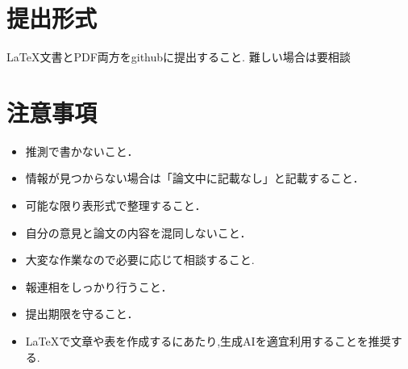 \documentclass[a4j, twocolumn]{jsarticle}  %
\begin{document}
\section{提出形式}

LaTeX文書とPDF両方をgithubに提出すること.
難しい場合は要相談

\section{注意事項}

\begin{itemize}
    \item 推測で書かないこと．
    \item 情報が見つからない場合は「論文中に記載なし」と記載すること．
    \item 可能な限り表形式で整理すること．%
    \item 自分の意見と論文の内容を混同しないこと．
    \item 大変な作業なので必要に応じて相談すること.
    \item 報連相をしっかり行うこと．
    \item 提出期限を守ること．
    \item LaTeXで文章や表を作成するにあたり,生成AIを適宜利用することを推奨する.
\end{itemize}
\end{document}
